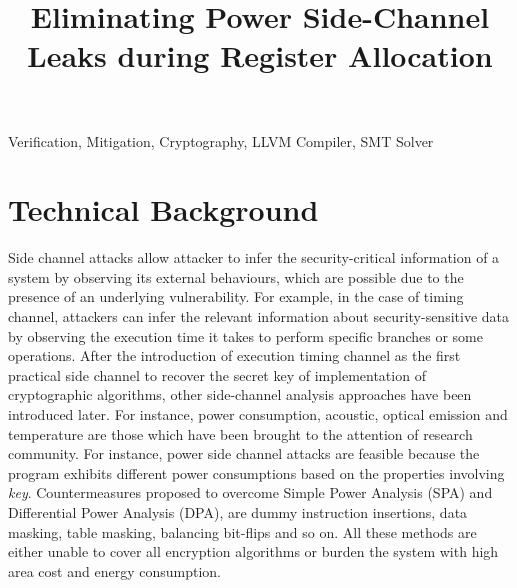 \documentclass[10pt, conference]{IEEEtran}
\begin{document}
\makeatletter
\def\BState{\State\hskip-\ALG@thistlm}
\makeatother


\title{Eliminating Power Side-Channel Leaks during Register Allocation\\
}

\author{
}

\maketitle

\begin{IEEEkeywords}
Verification, Mitigation, Cryptography, LLVM Compiler,  SMT Solver
\end{IEEEkeywords}

\section{Technical Background}
Side channel attacks allow attacker to infer the security-critical information of a system by observing its external behaviours, which are possible due to the presence of an underlying vulnerability. For example, in the case of timing channel, attackers can infer the relevant information about security-sensitive data by observing the execution time it takes to perform specific branches or some operations. After the introduction of execution timing channel as the first practical side channel to recover the secret key of implementation of cryptographic algorithms, other side-channel analysis approaches have been introduced later\cite{moradi2014side}. For instance, power consumption, acoustic, optical emission and temperature are those which have been brought to the attention of research community. For instance, power side channel attacks are feasible because the program exhibits different power consumptions based on the properties involving \emph{key}. Countermeasures proposed to overcome Simple Power Analysis (SPA) and Differential Power Analysis (DPA), are dummy instruction insertions, data masking, table masking, balancing bit-flips and so on. All these methods are either unable to cover all encryption algorithms or burden the system with high area cost and energy consumption.\cite{ambrose2007rijid}
\end{document}

